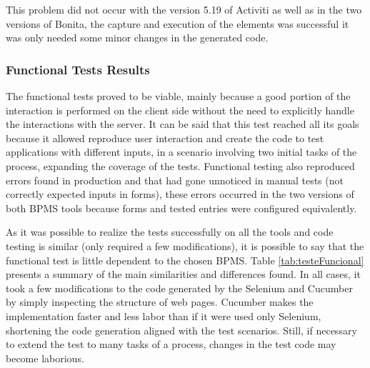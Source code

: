 \documentclass[runningheads,a4paper]{llncs}
\begin{document}
This problem did not occur with the version 5.19 of Activiti as well as in the two versions of Bonita, the capture and execution of the elements was successful it was only needed some minor changes in the generated code.

\subsubsection{Functional Tests Results} 
The functional tests proved to be viable, mainly because a good portion of the interaction is performed on the client side without the need to explicitly handle the interactions with the server. It can be said that this test reached all its goals because it allowed reproduce user interaction and create the code to test applications with different inputs, in a scenario involving two initial tasks of the process, expanding the coverage of the tests. Functional testing also reproduced errors found in production and that had gone unnoticed in manual tests (not correctly expected inputs in forms), these errors occurred in the two versions of both BPMS tools because forms and tested entries were configured equivalently.


As it was possible to realize the tests successfully on all the tools and code testing is similar (only required a few modifications), it is possible to say that the functional test is little dependent to the chosen BPMS. Table \ref{tab:testeFuncional} presents a summary of the main similarities and differences found. In all cases, it took a few modifications to the code generated by the Selenium and Cucumber by simply inspecting the structure of web pages. Cucumber makes the implementation faster and less labor than if it were used only Selenium, shortening the code generation aligned with the test scenarios. Still, if necessary to extend the test to many tasks of a process, changes in the test code may become laborious.
\end{document}
